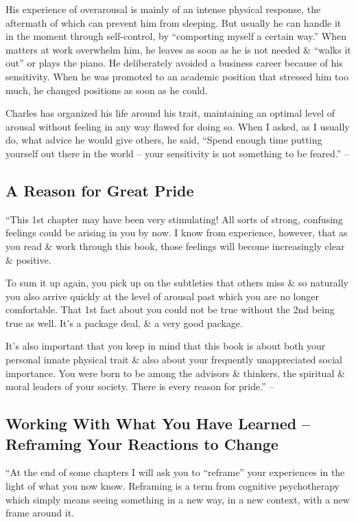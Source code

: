 \documentclass{article}
\numberwithin{equation}{section}
\begin{document}
His experience of overarousal is mainly of an intense physical response, the aftermath of which can prevent him from sleeping. But usually he can handle it in the moment through self-control, by ``comporting myself a certain way.'' When matters at work overwhelm him, he leaves as soon as he is not needed \& ``walks it out'' or plays the piano. He deliberately avoided a business career because of his sensitivity. When he was promoted to an academic position that stressed him too much, he changed positions as soon as he could.

Charles has organized his life around his trait, maintaining an optimal level of arousal without feeling in any way flawed for doing so. When I asked, as I usually do, what advice he would give others, he said, ``Spend enough time putting yourself out there in the world -- your sensitivity is not something to be feared.'' -- \cite[pp. 52--54]{Aron2013}

\subsection{A Reason for Great Pride}
``This 1st chapter may have been very stimulating! All sorts of strong, confusing feelings could be arising in you by now. I know from experience, however, that as you read \& work through this book, those feelings will become increasingly clear \& positive.

To sum it up again, you pick up on the subtleties that others miss \& so naturally you also arrive quickly at the level of arousal past which you are no longer comfortable. That 1st fact about you could not be true without the 2nd being true as well. It's a package deal, \& a very good package.

It's also important that you keep in mind that this book is about both your personal innate physical trait \& also about your frequently unappreciated social importance. You were born to be among the advisors \& thinkers, the spiritual \& moral leaders of your society. There is every reason for pride.'' -- \cite[p. 54]{Aron2013}

\subsection{Working With What You Have Learned -- Reframing Your Reactions to Change}
``At the end of some chapters I will ask you to ``reframe'' your experiences in the light of what you now know. Reframing is a term from cognitive psychotherapy which simply means seeing something in a new way, in a new context, with a new frame around it.
\end{document}
